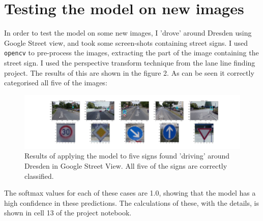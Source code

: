 \documentclass[letterpaper,12pt]{article}
\begin{document}
\section{Testing the model on new images}
In order to test the model on some new images, I 'drove' around Dresden using Google Street view, and took some screen-shots containing street signs. I used \texttt{opencv} to pre-process the images, extracting the part of the image containing the street sign. I used the perspective transform technique from the lane line finding project. The results of this are shown in the figure 2. As can be seen it correctly categorised all five of the images:
\begin{figure}
\includegraphics[scale=0.2]{../results/new.pdf}
\caption{Results of applying the model to five signs found 'driving' around Dresden in Google Street View. All five of the signs are correctly classified. }
\end{figure}
The softmax values for each of these cases are 1.0, showing that the model has a high confidence in these predictions. The calculations of these, with the details, is shown in cell 13 of the project notebook.
\end{document}
